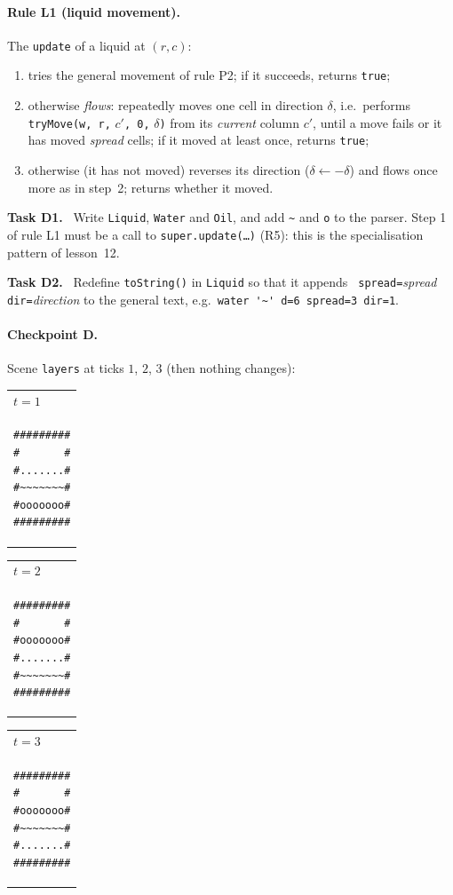 \documentclass[11pt,a4paper]{article}
\makeatletter
\newcommand{\code}[1]{\texttt{#1}}
\newenvironment{checkpoint}[1]
  {\begin{tabular}[t]{@{}l@{}}\footnotesize #1\\[2pt]}
  {\end{tabular}}
\newcommand{\task}[1]{\par\medskip\textbf{Task #1.}\ }
\makeatother
\begin{document}
\paragraph{Rule L1 (liquid movement).} The \code{update} of a liquid at \((r,c)\):
\begin{enumerate}[nosep]
  \item tries the general movement of rule P2; if it succeeds, returns \code{true};
  \item otherwise \emph{flows}: repeatedly moves one cell in direction \(\delta\), i.e.\ performs
        \code{tryMove(w, r,} \(c'\)\code{, 0,} \(\delta\)\code{)} from its \emph{current} column \(c'\), until
        a move fails or it has moved \emph{spread} cells; if it moved at least once, returns
        \code{true};
  \item otherwise (it has not moved) reverses its direction (\(\delta \leftarrow -\delta\)) and
        flows once more as in step~2; returns whether it moved.
\end{enumerate}

\task{D1} Write \code{Liquid}, \code{Water} and \code{Oil}, and add \verb|~| and \verb|o| to the
parser. Step 1 of rule L1 must be a call to \code{super.update(\ldots)} (R5): this is the
specialisation pattern of lesson~12.

\task{D2} Redefine \code{toString()} in \code{Liquid} so that it appends
\verb*| spread=|\textit{spread}\verb*| dir=|\textit{direction} to the general text, e.g.\
\verb|water '~' d=6 spread=3 dir=1|.

\paragraph{Checkpoint D.} Scene \code{layers} at ticks \(1\), \(2\), \(3\) (then nothing changes):
\begin{center}
\begin{checkpoint}{$t=1$}
\begin{BVerbatim}
#########
#       #
#.......#
#~~~~~~~#
#ooooooo#
#########
\end{BVerbatim}
\end{checkpoint}
\hspace{1.6em}
\begin{checkpoint}{$t=2$}
\begin{BVerbatim}
#########
#       #
#ooooooo#
#.......#
#~~~~~~~#
#########
\end{BVerbatim}
\end{checkpoint}
\hspace{1.6em}
\begin{checkpoint}{$t=3$}
\begin{BVerbatim}
#########
#       #
#ooooooo#
#~~~~~~~#
#.......#
#########
\end{BVerbatim}
\end{checkpoint}
\end{center}
\end{document}

